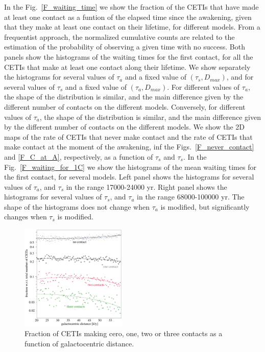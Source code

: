 \documentclass[crop]{CSLB}%
\begin{document}
In the Fig.~\ref{F_waiting_time} we show the fraction of the CETIs
that have made at least one contact as a funtion of the elapsed time
since the awakening, given that they make at least one contact on
their lifetime, for different models.
%
From a frequentist approach, the normalized cumulative counts are
related to the estimation of the probability of observing a given time
with no success.
%             
Both panels show the histograms of the waiting times for the first
contact, for all the CETIs that make at least one contact along their
lifetime.
%
We show separately the histograms for several values of $\tau_a$ and a
fixed value of $(\tau_s, D_{max})$, and for several values of $\tau_s$
and a fixed value of $(\tau_a, D_{max})$.
%
For different values of $\tau_a$, the shape of the distribution is
similar, and the main difference given by the different number of
contacts on the different models.
%
Conversely, for different values of $\tau_a$, the shape of the
distribution is similar, and the main difference given by the
different number of contacts on the different models. 
%
We show the 2D maps of the rate of CETIs that never make contact and
the rate of CETIs that make contact at the moment of the awakening,
inf the Figs.~\ref{F_never_contact} and \ref{F_C_at_A}, respectively,
as a function of $\tau_s$ and $\tau_s$.
%
In the Fig.~\ref{F_waiting_for_1C} we show the histograms of the mean
waiting times for the first contact, for several models.
%
Left panel shows the histograms for several values of $\tau_a$, and
$\tau_s$ in the range 17000-24000 yr.
%
Right panel shows the histograms for several values of $\tau_s$, and
$\tau_a$ in the range 68000-100000 yr.
%
The shape of the histograms does not change when $\tau_a$ is modified,
but significantly changes when $\tau_s$ is modified.


                   
\begin{figure}
   \centering
   \includegraphics[width=0.45\textwidth]{galactocentric_frac.pdf}
   \caption{Fraction of CETIs making cero, one, two or three contacts
   as a function of galactocentric distance.}
   \label{F_radial_frac}
\end{figure}
           
\end{document}
